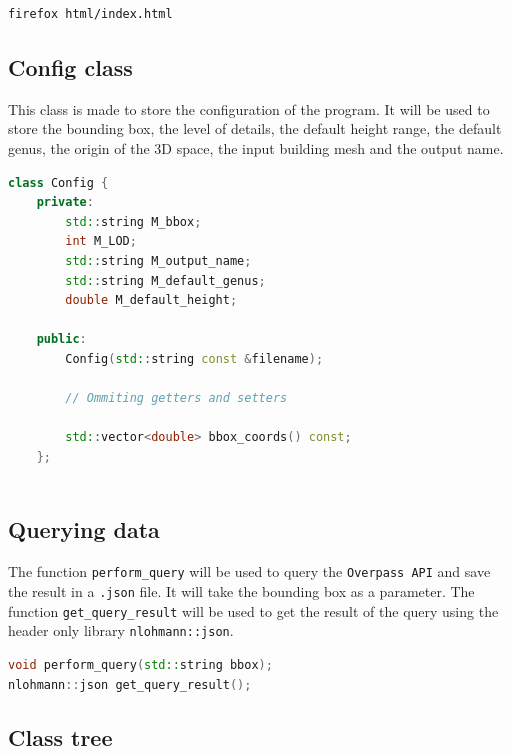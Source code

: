 \documentclass[12pt]{article}
\begin{document}
\begin{lstlisting}[language=bash]
firefox html/index.html
\end{lstlisting}

\subsection{Config class}

This class is made to store the configuration of the program. It will be used to
store the bounding box, the level of details, the default height range, the default
genus, the origin of the 3D space, the input building mesh and the output name.

\begin{lstlisting}[language=C++]
class Config {
    private:
        std::string M_bbox;
        int M_LOD;
        std::string M_output_name;
        std::string M_default_genus;
        double M_default_height;
    
    public:
        Config(std::string const &filename);

        // Ommiting getters and setters

        std::vector<double> bbox_coords() const;
    };
    
\end{lstlisting}

\subsection{Querying data}

The function \texttt{perform\_query} will be used to query the \texttt{Overpass API}
and save the result in a \texttt{.json} file. It will take the bounding box as a
parameter.
The function \texttt{get\_query\_result} will be used to get the result of the query
using the header only library \texttt{nlohmann::json}.

\begin{lstlisting}[language=C++]
void perform_query(std::string bbox);
nlohmann::json get_query_result();
\end{lstlisting}

\subsection{Class tree}
\end{document}

